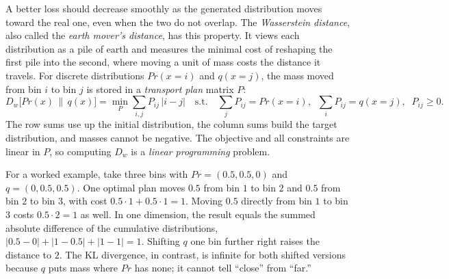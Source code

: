 A better loss should decrease smoothly as the generated distribution moves
toward the real one, even when the two do not overlap. The \emph{Wasserstein
distance}, also called the \emph{earth mover's distance}, has this property. It
views each distribution as a pile of earth and measures the minimal cost of
reshaping the first pile into the second, where moving a unit of mass costs the
distance it travels. For discrete distributions $Pr(x=i)$ and $q(x=j)$, the
mass moved from bin $i$ to bin $j$ is stored in a \emph{transport plan} matrix
$P$:
\begin{equation}
  D_w\bigl[Pr(x)\,\|\,q(x)\bigr] = \min_{P}\sum_{i,j} P_{ij}\,|i-j|
  \quad\text{s.t.}\quad
  \sum_j P_{ij}=Pr(x=i),\;\;
  \sum_i P_{ij}=q(x=j),\;\;
  P_{ij}\ge0 .
  \label{eq:wasserstein-discrete}
\end{equation}
\noindent
The row sums use up the initial distribution, the column sums build the target
distribution, and masses cannot be negative. The objective and all constraints
are linear in $P$, so computing $D_w$ is a \emph{linear programming} problem.

For a worked example, take three bins with $Pr=(0.5,0.5,0)$ and
$q=(0,0.5,0.5)$. One optimal plan moves $0.5$ from bin $1$ to bin $2$ and $0.5$
from bin $2$ to bin $3$, with cost $0.5\cdot1+0.5\cdot1=1$. Moving $0.5$
directly from bin $1$ to bin $3$ costs $0.5\cdot2=1$ as well. In one dimension,
the result equals the summed absolute difference of the cumulative
distributions, $|0.5-0|+|1-0.5|+|1-1|=1$. Shifting $q$ one bin further right
raises the distance to $2$. The KL divergence, in contrast, is infinite for
both shifted versions because $q$ puts mass where $Pr$ has none; it cannot tell
``close'' from ``far.''


